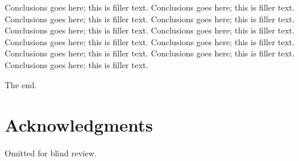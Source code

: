 \documentclass{sig-alternate}
\begin{document}
Conclusions goes here; this is filler text. Conclusions goes here; this is filler text. Conclusions goes here; this is filler text. Conclusions goes here; this is filler text. Conclusions goes here; this is filler text. Conclusions goes here; this is filler text. Conclusions goes here; this is filler text. Conclusions goes here; this is filler text. Conclusions goes here; this is filler text. Conclusions goes here; this is filler text. Conclusions goes here; this is filler text. 

The end.


\section{Acknowledgments}
Omitted for blind review.

%

%
%
\end{document}
